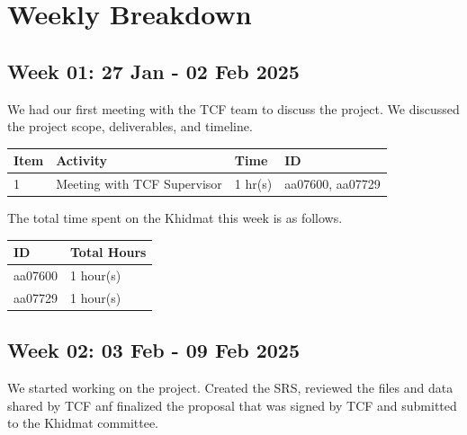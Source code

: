 \documentclass[12pt,a4paper]{article}
\begin{document}
\newpage %

\section{Weekly Breakdown}

\subsection{Week 01: 27 Jan - 02 Feb 2025}
We had our first meeting with the TCF team to discuss the project. We discussed the project scope, deliverables, and timeline.

\begin{center}
    \bigskip
    \begin{tabular}{|l|l|l|l|}
        \hline
        Item 	& Activity & Time & ID \\\hline\hline
        1	& Meeting with TCF Supervisor & 1 hr(s) & aa07600, aa07729 \\\hline
    \end{tabular}

    \bigskip
    The total time spent on the Khidmat this week is as follows.

    \bigskip
    \begin{tabular}{|l|l|}
        \hline
        ID & Total Hours\\\hline\hline
        aa07600 & 1 hour(s)\\\hline
        aa07729 & 1 hour(s)\\\hline
    \end{tabular}
\end{center}

\newpage

\subsection{Week 02: 03 Feb - 09 Feb 2025}
We started working on the project. Created the SRS, reviewed the files and data shared by TCF anf finalized the proposal that was signed by TCF and submitted to the Khidmat committee.
\end{document}
